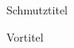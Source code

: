 \documentclass[open=any, index=totoc, paper=160mm:234mm, chapterprefix=true,
	fontsize=10pt, DIV=10, BCOR=12mm]{scrbook}
\begin{document}
\frontmatter
%
\frontmatter
\thispagestyle{empty}
\vspace*{\fill}
\begin{center}Schmutztitel\end{center}
\clearpage\thispagestyle{empty}
\begin{center}{\LARGE Vortitel}\end{center}
\end{document}
